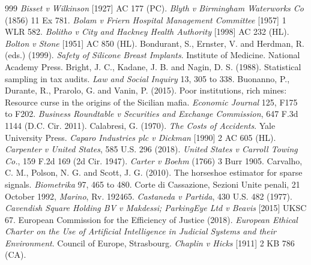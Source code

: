 \begin{thebibliography}{999}
 \emph{Bisset v Wilkinson} [1927] AC 177 (PC).
 \emph{Blyth v Birmingham Waterworks Co} (1856) 11 Ex 781.
 \emph{Bolam v Friern Hospital Management Committee} [1957] 1 WLR 582.
 \emph{Bolitho v City and Hackney Health Authority} [1998] AC 232 (HL).
 \emph{Bolton v Stone} [1951] AC 850 (HL).
 Bondurant, S., Ernster, V. and Herdman, R. (eds.) (1999). \emph{Safety of Silicone Breast Implants}. Institute of Medicine. National Academy Press.
 Bright, J. C., Kadane, J. B. and Nagin, D. S. (1988). Statistical sampling in tax audits. \emph{Law and Social Inquiry} 13, 305 to 338.
 Buonanno, P., Durante, R., Prarolo, G. and Vanin, P. (2015). Poor institutions, rich mines: Resource curse in the origins of the Sicilian mafia. \emph{Economic Journal} 125, F175 to F202.
 \emph{Business Roundtable v Securities and Exchange Commission}, 647 F.3d 1144 (D.C. Cir. 2011).
 Calabresi, G. (1970). \emph{The Costs of Accidents}. Yale University Press.
 \emph{Caparo Industries plc v Dickman} [1990] 2 AC 605 (HL).
 \emph{Carpenter v United States}, 585 U.S. 296 (2018).
 \emph{United States v Carroll Towing Co.}, 159 F.2d 169 (2d Cir. 1947).
 \emph{Carter v Boehm} (1766) 3 Burr 1905.
 Carvalho, C. M., Polson, N. G. and Scott, J. G. (2010). The horseshoe estimator for sparse signals. \emph{Biometrika} 97, 465 to 480.
 Corte di Cassazione, Sezioni Unite penali, 21 October 1992, \emph{Marino}, Rv. 192465.
 \emph{Castaneda v Partida}, 430 U.S. 482 (1977).
 \emph{Cavendish Square Holding BV v Makdessi; ParkingEye Ltd v Beavis} [2015] UKSC 67.
 European Commission for the Efficiency of Justice (2018). \emph{European Ethical Charter on the Use of Artificial Intelligence in Judicial Systems and their Environment}. Council of Europe, Strasbourg.
 \emph{Chaplin v Hicks} [1911] 2 KB 786 (CA).

\end{thebibliography}
